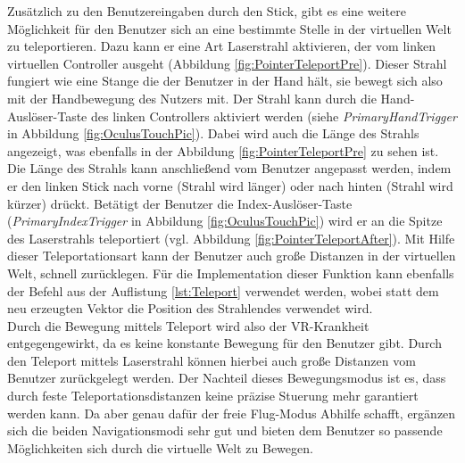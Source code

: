 Zusätzlich zu den Benutzereingaben durch den Stick, gibt es eine weitere Möglichkeit für den Benutzer sich an eine bestimmte Stelle in der virtuellen Welt zu teleportieren. Dazu kann er eine Art Laserstrahl aktivieren, der vom linken virtuellen Controller ausgeht (Abbildung \ref{fig:PointerTeleportPre}). Dieser Strahl fungiert wie eine Stange die der Benutzer in der Hand hält, sie bewegt sich also mit der Handbewegung des Nutzers mit. Der Strahl kann durch die Hand-Auslöser-Taste des linken Controllers aktiviert werden (siehe \textit{PrimaryHandTrigger} in Abbildung \ref{fig:OculusTouchPic}). Dabei wird auch die Länge des Strahls angezeigt, was ebenfalls in der Abbildung \ref{fig:PointerTeleportPre} zu sehen ist. Die Länge des Strahls kann anschließend vom Benutzer angepasst werden, indem er den linken Stick nach vorne (Strahl wird länger) oder nach hinten (Strahl wird kürzer) drückt. Betätigt der Benutzer die Index-Auslöser-Taste (\textit{PrimaryIndexTrigger} in Abbildung \ref{fig:OculusTouchPic}) wird er an die Spitze des Laserstrahls teleportiert (vgl. Abbildung \ref{fig:PointerTeleportAfter}). Mit Hilfe dieser Teleportationsart kann der Benutzer auch große Distanzen in der virtuellen Welt, schnell zurücklegen. Für die Implementation dieser Funktion kann ebenfalls der Befehl aus der Auflistung \ref{lst:Teleport} verwendet werden, wobei statt dem neu erzeugten Vektor die Position des Strahlendes verwendet wird.\\

Durch die Bewegung mittels Teleport wird also der VR-Krankheit entgegengewirkt, da es keine konstante Bewegung für den Benutzer gibt. Durch den Teleport mittels Laserstrahl können hierbei auch große Distanzen vom Benutzer zurückgelegt werden. Der Nachteil dieses Bewegungsmodus ist es, dass durch feste Teleportationsdistanzen keine präzise Stuerung mehr garantiert werden kann. Da aber genau dafür der freie Flug-Modus Abhilfe schafft, ergänzen sich die beiden Navigationsmodi sehr gut und bieten dem Benutzer so passende Möglichkeiten sich durch die virtuelle Welt zu Bewegen.
 

